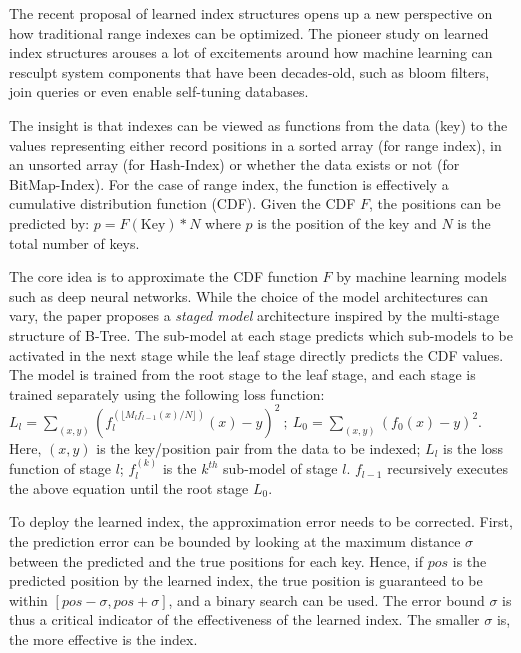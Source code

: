 \begin{bigabstract}
The recent proposal of learned index structures opens up a new perspective on how traditional range indexes can be optimized.
The pioneer study on learned index structures arouses a lot of excitements around how machine learning can resculpt system components that have been decades-old, such as bloom filters, join queries or even enable self-tuning databases.

The insight is that indexes can be viewed as functions from the data (key) to the values representing either record positions in a sorted array (for range index), in an unsorted array (for Hash-Index) or whether the data exists or not (for BitMap-Index).
For the case of range index, the function is effectively a cumulative distribution function (CDF).
Given the CDF $F$, the positions can be predicted by: $p=F(\text{Key})*N$ where $p$ is the position of the key and $N$ is the total number of keys.

The core idea is to approximate the CDF function $F$ by machine learning models such as deep neural networks.
While the choice of the model architectures can vary, the paper proposes a \emph{staged model} architecture inspired by the multi-stage structure of B-Tree.
The sub-model at each stage predicts which sub-models to be activated in the next stage while the leaf stage directly predicts the CDF values.
The model is trained from the root stage to the leaf stage, and each stage is trained separately using the following loss function: $L_l=\sum_{(x,y)}(f_l^{(\lfloor M_lf_{l-1}(x)/N\rfloor )}(x)-y)^2~;~L_0=\sum_{(x,y)}(f_0(x)-y)^2$.
Here, $(x,y)$ is the key/position pair from the data to be indexed; $L_l$ is the loss function of stage $l$; $f_l^{(k)}$ is the $k^{th}$ sub-model of stage $l$.
$f_{l-1}$ recursively executes the above equation until the root stage $L_0$.

To deploy the learned index, the approximation error needs to be corrected.
First, the prediction error can be bounded by looking at the maximum distance $\sigma$ between the predicted and the true positions for each key.
Hence, if $pos$ is the predicted position by the learned index, the true position is guaranteed to be within $[pos-\sigma, pos+\sigma]$, and a binary search can be used.
The error bound $\sigma$ is thus a critical indicator of the effectiveness of the learned index.
The smaller $\sigma$ is, the more effective is the index.


\end{bigabstract}
